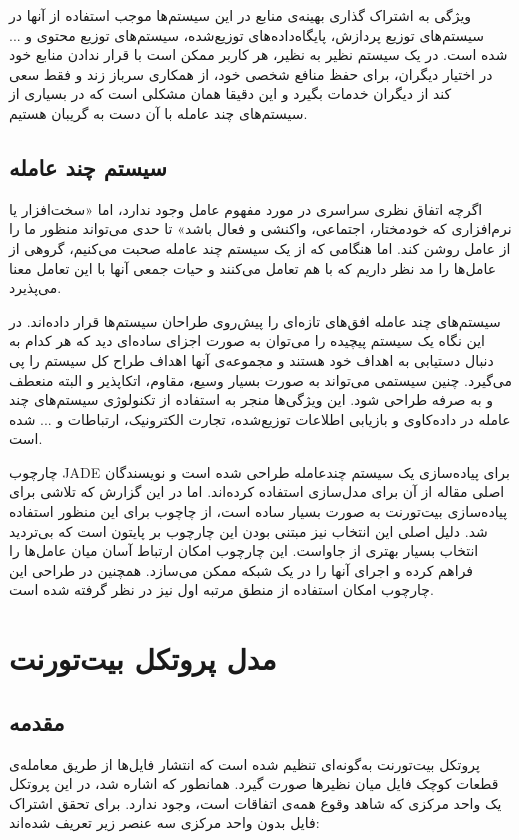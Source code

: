 \documentclass{article}
\begin{document}
ویژگی به اشتراک گذاری بهینه‌ی منابع در این سیستم‌ها موجب استفاده از آنها در سیستم‌های توزیع پردازش، پایگاه‌داده‌های توزیع‌شده، سیستم‌های توزیع محتوی و ... شده است. در یک سیستم نظیر به نظیر، هر کاربر ممکن است با قرار ندادن منابع خود در اختیار دیگران، برای حفظ منافع شخصی خود، از همکاری سرباز زند و فقط سعی کند از دیگران خدمات بگیرد و این دقیقا همان مشکلی است که در بسیاری از سیستم‌های چند عامله با آن دست به گریبان هستیم.  

\subsection{سیستم چند عامله}
اگرچه اتفاق نظری سراسری در مورد مفهوم عامل وجود ندارد، اما «سخت‌افزار یا نرم‌افزاری که خودمختار، اجتماعی، واکنشی و فعال باشد»\cite{wooldridge} تا حدی می‌تواند منظور ما را از عامل روشن کند. اما هنگامی که از یک سیستم چند عامله صحبت می‌کنیم، گروهی از عامل‌ها را مد نظر داریم که با هم تعامل می‌کنند و حیات جمعی آنها با این تعامل معنا می‌پذیرد.

سیستم‌های چند عامله افق‌های تازه‌ای را پیش‌روی طراحان سیستم‌ها قرار داده‌اند. در این نگاه یک سیستم پیچیده را می‌توان به صورت اجزای ساده‌ای دید که هر کدام به دنبال دستیابی به اهداف خود هستند و مجموعه‌ی آنها اهداف طراح کل سیستم را پی می‌گیرد. چنین سیستمی می‌تواند به صورت بسیار وسیع، مقاوم، اتکاپذیر و البته منعطف و به صرفه طراحی شود. این ویژگی‌ها منجر به استفاده از تکنولوژی سیستم‌های چند عامله در داده‌کاوی و بازیابی اطلاعات توزیع‌شده، تجارت الکترونیک، ارتباطات و ... شده است.

چارچوب JADE برای پیاده‌سازی یک سیستم چندعامله طراحی شده است و نویسندگان اصلی مقاله از آن برای مدل‌سازی استفاده کرده‌اند. اما در این گزارش که تلاشی برای پیاده‌سازی بیت‌تورنت به صورت بسیار ساده است، از چاچوب  برای این منظور استفاده شد. دلیل اصلی این انتخاب نیز مبتنی بودن این چارچوب بر پایتون است که بی‌تردید انتخاب بسیار بهتری از جاواست. این چارچوب امکان ارتباط آسان میان عامل‌ها را فراهم کرده و اجرای آنها را در یک شبکه ممکن می‌سازد. همچنین در طراحی این چارچوب امکان استفاده از منطق مرتبه اول نیز در نظر گرفته شده است. 

\section{مدل پروتکل بیت‌تورنت}

\subsection{مقدمه}
پروتکل بیت‌تورنت به‌گونه‌ای تنظیم شده است که انتشار فایل‌ها از طریق معامله‌ی قطعات کوچک فایل میان نظیرها صورت گیرد. همانطور که اشاره شد، در این پروتکل یک واحد مرکزی که شاهد وقوع همه‌ی اتفاقات است، وجود ندارد. برای تحقق اشتراک فایل بدون واحد مرکزی سه عنصر زیر تعریف شده‌اند:
\end{document}
